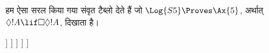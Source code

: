 \documentclass[../../../include/open-logic-section]{subfiles}
\begin{document}
\begin{ex}
  हम ऐसा सरल किया गया संवृत टैब्लो देते हैं जो $\Log{S5} \Proves
  \Ax{5}$, अर्थात् $\Diamond!A \lif \Box\Diamond!A$, दिखाता है।
  \begin{oltableau}
    [\pFmla{\False}{\Diamond\formula{A} \lif \Box\Diamond \formula{A}}{1},
      just = \TAss
      [\pFmla{\True}{\Diamond \formula{A}}{1}, just = {\TRule{\False}{\lif}[1]}
        [\pFmla{\False}{\Box\Diamond \formula{A}}{1},
          just = {\TRule{\False}{\lif}[1]}
          [\pFmla{\False}{\Diamond \formula{A}}{2},
            just = {\TRule{\False}{\Box}[3]}
            [\pFmla{\True}{\formula{A}}{3},
              just = {\TRule{\True}{\Diamond}[2]}
                [\pFmla{\False}{\formula{A}}{3},
                  just = {\TRule{\False}{\Diamond}[4]}, close]
            ]
          ]
        ]
      ]
    ]
  \end{oltableau}
\end{ex}
\end{document}
